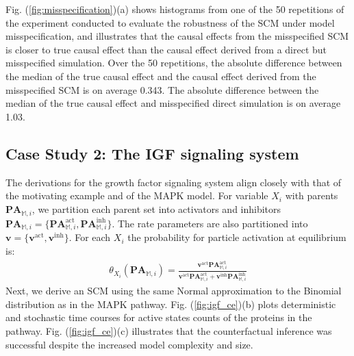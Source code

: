 \documentclass{article}
\def\figref#1{Fig. (\ref{#1})}
\begin{document}
 \figref{fig:misspecification}(a) shows histograms from one of the 50 repetitions of the experiment conducted to evaluate the robustness of the SCM under model misspecification, and illustrates that the causal effects from the misspecified SCM is closer to true causal effect than the causal effect derived from a direct but misspecified simulation. Over the 50 repetitions, the absolute difference between the median of the true causal effect and the causal effect derived from the misspecified SCM is on average 0.343. The absolute difference between the median of the true causal effect and misspecified direct simulation is on average 1.03.

\vspace{-2mm}
\subsection{Case Study 2: The IGF signaling system}

\vspace{-2mm}

The derivations for the growth factor signaling system align closely with that of the motivating example and of the MAPK model.
For variable $X_i$ with parents $\mathbf{PA}_{\mathbb{M}, i}$, we partition each parent set into activators and inhibitors $\mathbf{PA}_{\mathbb{M}, i} = \{\mathbf{PA}^{\text{act}}_{\mathbb{M}, i},\mathbf{PA}^{\text{inh}}_{\mathbb{M}, i} \}$. The rate parameters are also partitioned into $\mathbf{v} = \{\mathbf{v}^{\text{act}}, \mathbf{v}^{\text{inh}}\}$. For each $X_i$ the probability for particle activation at equilibrium is:
\vspace{-2mm}
\begin{align}
\theta_{X_i}(\mathbf{PA}_{\mathbb{M}, i})= \frac{\mathbf{v}^{\text{act}}\mathbf{PA}^{\text{act}}_{\mathbb{M}, i}}{\mathbf{v}^{\text{act}}\mathbf{PA}^{\text{act}}_{\mathbb{M}, i} + \mathbf{v}^{\text{inh}}\mathbf{PA}^{\text{inh}}_{\mathbb{M}, i}}
\end{align}
Next, we derive an SCM using the same Normal approximation to the Binomial distribution as in the MAPK pathway.
\figref{fig:igf_ce}(b) plots deterministic and stochastic time courses for active states counts of the proteins in the pathway. \figref{fig:igf_ce}(c) illustrates that the counterfactual inference was successful despite the increased model complexity and size.
\end{document}
